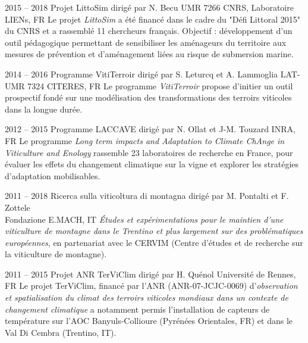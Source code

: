 \documentclass[]{cv-etienne}
\begin{document}
\begin{entrylist}
  \entry
  {2015 -- 2018}
  {Projet LittoSim {\normalfont dirigé par N. Becu}}
  {UMR 7266 CNRS, Laboratoire LIENs, FR}
  {
  Le projet \emph{LittoSim} a été financé dans le cadre du "Défi Littoral 2015" du CNRS et a rassemblé 11 chercheurs français. Objectif : développement d'un outil pédagogique permettant de sensibiliser les aménageurs du territoire aux mesures de prévention et d'aménagement liées au risque de submersion marine.
  }
\end{entrylist}
\begin{entrylist}
  \entry
  {2014 -- 2016}
  {Programme VitiTerroir {\normalfont dirigé par S. Leturcq et A. Lammoglia}}
  {LAT-UMR 7324 CITERES, FR}
  {Le programme \emph{VitiTerroir} propose d'initier un outil prospectif fondé sur une modélisation des transformations des terroirs viticoles dans la longue durée.}
\end{entrylist}
\begin{entrylist}
  \entry
  {2012 -- 2015}
  {Programme LACCAVE {\normalfont dirigé par N. Ollat et J-M. Touzard}}
  {INRA, FR}
  {Le programme \emph{Long term impacts and Adaptation to Climate ChAnge in Viticulture and Enology} rassemble 23 laboratoires de recherche en France, pour évaluer les effets du changement climatique sur la vigne et explorer les stratégies d'adaptation mobilisables.}
\end{entrylist}
\begin{entrylist}
  \entry
  {2011 -- 2018}
  {Ricerca sulla viticoltura di montagna  {\normalfont  dirigé par M. Pontalti et F. Zottele \\}}
  { Fondazione E.MACH, IT}
  {\emph{Études et expérimentations pour le maintien d'une viticulture de montagne dans le Trentino et plus largement sur des problématiques européennes}, en partenariat avec le CERVIM  (Centre d'études et de recherche sur la viticulture de montagne).}
\end{entrylist}
\begin{entrylist}
  \entry
  {2011 -- 2015}
  {Projet ANR TerViClim {\normalfont dirigé par H. Quénol}}
  { Université de Rennes, FR}
  {Le projet TerViClim, financé par l'ANR (ANR-07-JCJC-0069) d'\emph{observation et spatialisation du climat des terroirs viticoles mondiaux dans un contexte de changement climatique} a notamment permis l'installation de capteurs de température sur l'AOC Banyuls-Collioure (Pyrénées Orientales, FR) et dans le Val Di Cembra (Trentino, IT).}
\end{entrylist}
\end{document}
